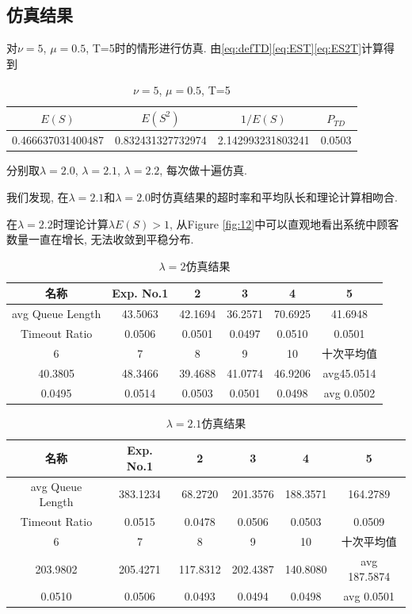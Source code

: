 \documentclass[a4paper, 12pt]{ctexart}
\begin{document}
\subsection{仿真结果}
对$\nu =5$, $\mu=0.5$, T=5时的情形进行仿真. 由\eqref{eq:defTD}\eqref{eq:EST}\eqref{eq:ES2T}计算得到
\begin{table}[!htbp]
\centering
\caption{$\nu =5$, $\mu=0.5$, T=5}\label{tab:lambda2}
\begin{tabular}{cccc}
\toprule
$E(S)$& $E(S^2)$& $1/E(S)$& $P_{TD}$\\
\midrule
0.466637031400487& 0.832431327732974&	2.142993231803241& 0.0503\\
\bottomrule
\end{tabular}
\end{table}

分别取$\lambda=2.0$, $\lambda=2.1$, $\lambda=2.2$, 每次做十遍仿真.

我们发现, 在$\lambda=2.1$和$\lambda=2.0$时仿真结果的超时率和平均队长和理论计算相吻合. 

在$\lambda=2.2$时理论计算$\lambda E(S)>1$, 从Figure \ref{fig:12}中可以直观地看出系统中顾客数量一直在增长, 无法收敛到平稳分布.

\begin{table}[!htbp]
\centering
\caption{$\lambda =2$仿真结果}\label{tab:lambda2}
\begin{tabular}{cccccc}
\toprule
名称& Exp. No.1& 2& 3& 4& 5\\
\midrule
avg Queue Length&
43.5063& 42.1694& 36.2571& 70.6925& 41.6948\\
Timeout Ratio&
0.0506& 0.0501& 0.0497& 0.0510& 0.0501\\
\bottomrule
\toprule
6& 7& 8& 9& 10& 十次平均值\\
\midrule
40.3805& 48.3466& 39.4688& 41.0774& 46.9206& avg45.0514\\
0.0495& 0.0514& 0.0503& 0.0501& 0.0498& avg 0.0502\\
\bottomrule
\end{tabular}
\end{table}

\begin{table}[!htbp]
\centering
\caption{$\lambda =2.1$仿真结果}\label{tab:lambda2}
\begin{tabular}{cccccc}
\toprule
名称& Exp. No.1& 2& 3& 4& 5\\
\midrule
avg Queue Length& 383.1234& 68.2720& 201.3576&  188.3571&  164.2789\\
Timeout Ratio& 0.0515& 0.0478& 0.0506& 0.0503& 0.0509\\
\bottomrule
\toprule
6& 7& 8& 9& 10& 十次平均值\\
\midrule
203.9802& 205.4271&  117.8312&  202.4387&  140.8080&
avg 187.5874\\
0.0510& 0.0506& 0.0493& 0.0494& 0.0498& avg 0.0501\\
\bottomrule
\end{tabular}
\end{table}
\end{document}
